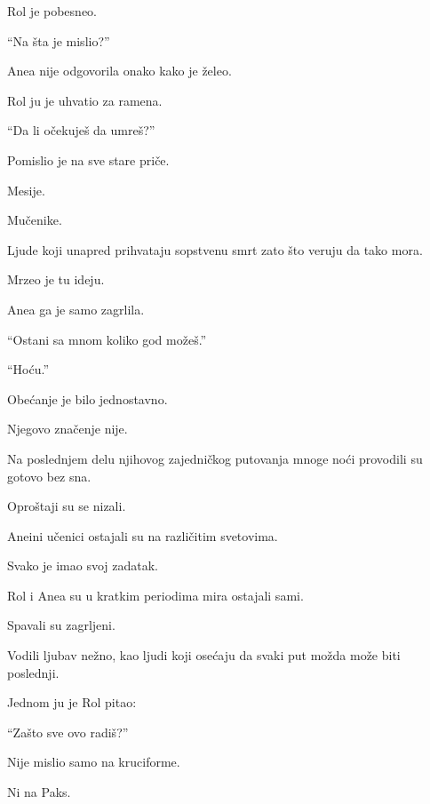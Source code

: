 \bigskip

Rol je pobesneo.

\bigskip

``Na šta je mislio?''

Anea nije odgovorila onako kako je želeo.

\bigskip

Rol ju je uhvatio za ramena.

``Da li očekuješ da umreš?''

\bigskip

Pomislio je na sve stare priče.

Mesije.

Mučenike.

Ljude koji unapred prihvataju sopstvenu smrt zato što veruju da tako mora.

\bigskip

Mrzeo je tu ideju.

\bigskip

Anea ga je samo zagrlila.

``Ostani sa mnom koliko god možeš.''

\bigskip

``Hoću.''

\bigskip

Obećanje je bilo jednostavno.

Njegovo značenje nije.

\bigskip

Na poslednjem delu njihovog zajedničkog putovanja mnoge noći provodili su gotovo bez sna.

\bigskip

Oproštaji su se nizali.

Aneini učenici ostajali su na različitim svetovima.

Svako je imao svoj zadatak.

\bigskip

Rol i Anea su u kratkim periodima mira ostajali sami.

\bigskip

Spavali su zagrljeni.

Vodili ljubav nežno, kao ljudi koji osećaju da svaki put možda može biti poslednji.

\bigskip

Jednom ju je Rol pitao:

``Zašto sve ovo radiš?''

\bigskip

Nije mislio samo na kruciforme.

Ni na Paks.

